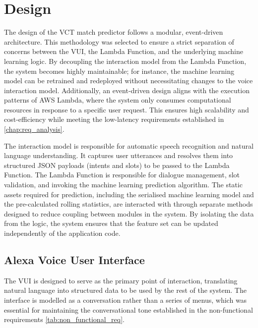 \chapter{Design}
\label{chap:design}
The design of the VCT match predictor follows a modular, event-driven architecture. This methodology was selected to ensure a strict separation of concerns between the VUI, the Lambda Function, and the underlying machine learning logic. By decoupling the interaction model from the Lambda Function, the system becomes highly maintainable; for instance, the machine learning model can be retrained and redeployed without necessitating changes to the voice interaction model. Additionally, an event-driven design aligns with the execution patterns of AWS Lambda, where the system only consumes computational resources in response to a specific user request. This ensures high scalability and cost-efficiency while meeting the low-latency requirements established in \autoref{chap:req_analysis}.

The interaction model is responsible for automatic speech recognition and natural language understanding. It captures user utterances and resolves them into structured JSON payloads (intents and slots) to be passed to the Lambda Function. The Lambda Function is responsible for dialogue management, slot validation, and invoking the machine learning prediction algorithm. The static assets required for prediction, including the serialised machine learning model and the pre-calculated rolling statistics, are interacted with through separate methods designed to reduce coupling between modules in the system. By isolating the data from the logic, the system ensures that the feature set can be updated independently of the application code.

\section{Alexa Voice User Interface}
The VUI is designed to serve as the primary point of interaction, translating natural language into structured data to be used by the rest of the system. The interface is modelled as a conversation rather than a series of menus, which was essential for maintaining the conversational tone established in the non-functional requirements \autoref{tab:non_functional_req}.

